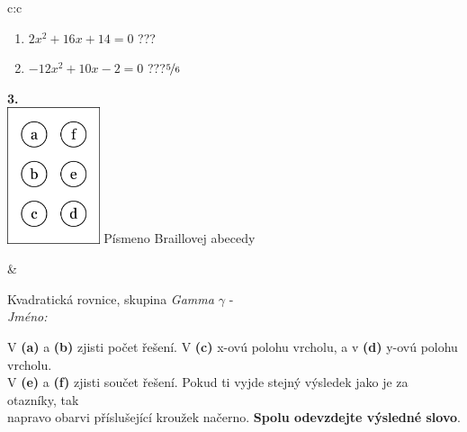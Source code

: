 \documentclass[10pt]{report}
\begin{document}
\begin{tabular}{c:c}
\begin{minipage}[c][104.5mm][t]{0.5\linewidth}
\begin{center}
\begin{minipage}{0.79\linewidth}
\begin{center}
\begin{varwidth}{\linewidth}
\begin{enumerate}
\item $2x^2+16x+14=0$\quad \dotfill\; ???\;\dotfill {}
\item $-12x^2+10x-2=0$\quad \dotfill\; ???\;\dotfill \quad $\nicefrac{5}{6}$
\end{enumerate}
\end{varwidth}
\end{center}
\end{minipage}
\begin{minipage}{0.20\linewidth}
\begin{center}
{\Huge\bfseries 3.} \\[2mm]
\includegraphics[height=40mm]{../images/braille.png}
{\small Písmeno Braillovej abecedy}
\end{center}
\end{minipage}
\end{center}
\end{minipage}
&
\begin{minipage}[c][104.5mm][t]{0.5\linewidth}
\begin{center}
\vspace{7mm}
{\huge Kvadratická rovnice, skupina \textit{Gamma $\gamma$} -}\\[5mm]
\textit{Jméno:}\phantom{xxxxxxxxxxxxxxxxxxxxxxxxxxxxxxxxxxxxxxxxxxxxxxxxxxxxxxxxxxxxxxxxx}\\[5mm]
\begin{minipage}{0.95\linewidth}
\begin{center}
V \textbf{(a)} a \textbf{(b)} zjisti počet řešení. V \textbf{(c)} x-ovú polohu vrcholu, a v \textbf{(d)} y-ovú polohu vrcholu.\\V \textbf{(e)} a \textbf{(f)} zjisti součet řešení. Pokud ti vyjde stejný výsledek jako je za otazníky, tak\\napravo obarvi příslušející kroužek načerno. \textbf{Spolu odevzdejte výsledné slovo}.
\end{center}
\end{minipage}
\\[1mm]
\begin{minipage}{0.79\linewidth}
\begin{center}

\end{center}
\end{minipage}
\end{center}
\end{minipage}
\end{tabular}
\end{document}

